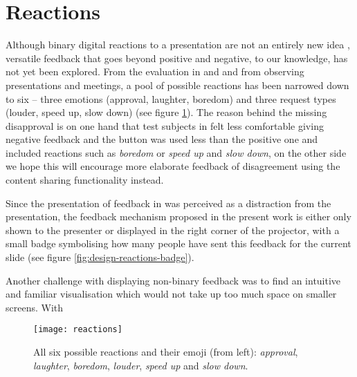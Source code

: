 \section{Reactions}
\label{sec:design-reactions}
Although binary digital reactions to a presentation are not an entirely new idea \cite{Teevan:MobileFeedbackDuringPresentation}, versatile feedback that goes beyond positive and negative, to our knowledge, has not yet been explored. From the evaluation in \cite{Teevan:MobileFeedbackDuringPresentation} and \cite{Isaacs:InteractivePresentationsDistributedAudience} and from observing presentations and meetings, a pool of possible reactions has been narrowed down to six --  three emotions (approval, laughter, boredom) and three request types (louder, speed up, slow down) (see figure \ref{fig:design-reactions}). The reason behind the missing disapproval is on one hand that test subjects in \cite{Teevan:MobileFeedbackDuringPresentation} felt less comfortable giving negative feedback and the button was used less than the positive one and included reactions such as \emph{boredom} or \emph{speed up} and \emph{slow down}, on the other side we hope this will encourage more elaborate feedback of disagreement using the content sharing functionality instead.

Since the presentation of feedback in \cite{Teevan:MobileFeedbackDuringPresentation} was perceived as a distraction from the presentation, the feedback mechanism proposed in the present work is either only shown to the presenter or displayed in the right corner of the projector, with a small badge symbolising how many people have sent this feedback for the current slide (see figure \ref{fig:design-reactions-badge}).

Another challenge with displaying non-binary feedback was to find an intuitive and familiar visualisation which would not take up too much space on smaller screens. With  

\begin{figure}
\centering
\texttt{[image: reactions]}
\caption{All six possible reactions and their emoji (from left): \emph{approval}, \emph{laughter}, \emph{boredom}, \emph{louder}, \emph{speed up} and \emph{slow down}.}
\label{fig:design-reactions}
\end{figure}


